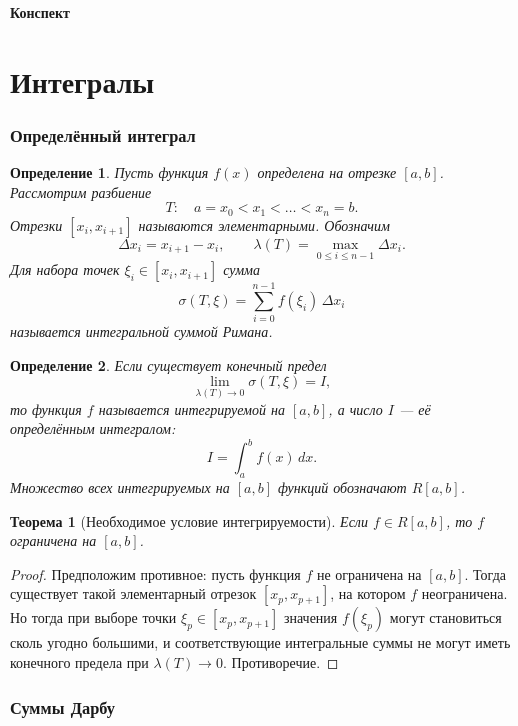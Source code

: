 \documentclass[10pt,a4paper]{article}
\theoremstyle{mystatement}
\newtheorem*{theorem}{Теорема}
\theoremstyle{mydefinition}
\newtheorem*{definition}{Определение}
\theoremstyle{myremark}
\let\oldpart\part
\renewcommand{\part}[1]{\oldpart{#1}\markboth{#1}{}}
\begin{document}
\thispagestyle{empty}

\begin{center}
  {\LARGE \textbf{Конспект}}
\end{center}

\vspace{12pt}
\tableofcontents

\part{Интегралы}

\section{Определённый интеграл}

\begin{definition}
Пусть функция $f(x)$ определена на отрезке $[a,b]$.
Рассмотрим разбиение
\[
T:\quad a=x_0<x_1<\dots<x_n=b.
\]
Отрезки $[x_i,x_{i+1}]$ называются \emph{элементарными}.
Обозначим
\[
\Delta x_i=x_{i+1}-x_i,\qquad \lambda(T)=\max_{0\le i\le n-1}\Delta x_i.
\]
Для набора точек $\xi_i\in[x_i,x_{i+1}]$ сумма
\[
\sigma(T,\xi)=\sum_{i=0}^{n-1} f(\xi_i)\,\Delta x_i
\]
называется \emph{интегральной суммой Римана}.
\end{definition}

\begin{definition}
Если существует конечный предел
\[
\lim_{\lambda(T)\to 0}\sigma(T,\xi)=I,
\]
то функция $f$ называется \emph{интегрируемой} на $[a,b]$, а число $I$ — её \emph{определённым интегралом}:
\[
I=\int_a^b f(x)\,dx.
\]
Множество всех интегрируемых на $[a,b]$ функций обозначают $R[a,b]$.
\end{definition}

\begin{theorem}[Необходимое условие интегрируемости]
Если $f\in R[a,b]$, то $f$ ограничена на $[a,b]$.
\end{theorem}

\begin{proof}
Предположим противное: пусть функция $f$ не ограничена на $[a,b]$.
Тогда существует такой элементарный отрезок $[x_p,x_{p+1}]$, на котором $f$ неограничена.
Но тогда при выборе точки $\xi_p\in[x_p,x_{p+1}]$ значения $f(\xi_p)$ могут становиться сколь угодно большими, и соответствующие интегральные суммы не могут иметь конечного предела при $\lambda(T)\to 0$.
Противоречие.
\end{proof}

\section{Суммы Дарбу}
\end{document}
